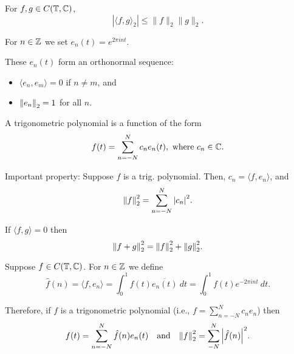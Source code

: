 \documentclass[twoside]{article}
\begin{document}
\begin{theorem}
    For $f, g \in C(\mathbb{T}, \mathbb{C})$,
    \begin{equation*}
        |\langle f, g \rangle_{2}| \leq \lVert f \rVert_{2} \lVert g \rVert_{2}.
    \end{equation*}
\end{theorem}

\begin{definition}
    For $n \in \mathbb{Z}$ we set $e_{n}(t) = e^{2 \pi i n t}$.

    These $e_{n}(t)$ form an orthonormal sequence:
    \begin{itemize}
        \item $\langle e_{n}, e_{m} \rangle = 0$ if $n \neq m$, and 
        \item $\norm{e_{n}}_{2} = 1$ for all $n$.
    \end{itemize}
\end{definition}

\begin{definition}
    A trigonometric polynomial is a function of the form 
    \begin{equation*}
        f(t) = \sum_{n = -N}^{N} c_{n}e_{n}(t), \text{ where } c_{n} \in \mathbb{C}.
    \end{equation*}

    Important property:
    Suppose $f$ is a trig. polynomial. Then, $c_{n} = \langle f, e_{n} \rangle$, and 
    \begin{equation*}
        \norm{f}_{2}^{2} = \sum_{n = -N}^{N} \abs{c_{n}}^{2}.
    \end{equation*}
\end{definition}

\begin{theorem}
    If $\langle f, g \rangle = 0$ then 
    \begin{equation*}
        \norm{f + g}_{2}^{2} = \norm{f}_{2}^{2} + \norm{g}_{2}^{2}.
    \end{equation*}
\end{theorem}

\begin{definition}
    Suppose $f \in C(\mathbb{T}, \mathbb{C})$. For $n \in \mathbb{Z}$ we define
    \begin{equation*}
        \hat{f}(n) = \langle f, e_{n} \rangle 
        = \int_{0}^{1} f(t)\overline{e_{n}(t)} \ dt 
        = \int_{0}^{1} f(t) e^{-2 \pi int} \ dt.
    \end{equation*}

    Therefore, if $f$ is a trigonometric polynomial (i.e., $f = \sum_{n = -N}^{N} c_{n}e_{n}$)
    then 
    \begin{equation*}
    f(t) = \sum_{n = -N}^{N} \hat{f}(n) e_{n}(t) \quad \text{and} \quad
    \norm{f}_{2}^{2} = \sum_{-N}^{N} \abs{\hat{f}(n)}^{2}.
    \end{equation*}
\end{definition}
\end{document}
